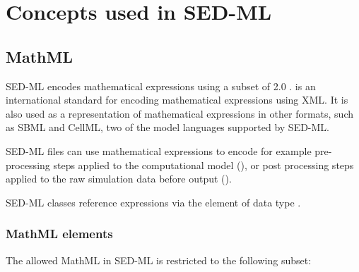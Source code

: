 \pagebreak
\chapter{Concepts used in SED-ML}
\label{chp:concepts}
\section{MathML}
\label{sec:mathML}
SED-ML encodes mathematical expressions using a subset of  2.0 \citep{CIM+01}.  is an international standard for encoding mathematical expressions using XML. It is also used as a representation of mathematical expressions in other formats, such as SBML and CellML, two of the model languages supported by SED-ML. 

SED-ML files can use mathematical expressions to encode for example pre-processing steps applied to the computational model (\ComputeChange), or post processing steps applied to the raw simulation data before output (\DataGenerator). 

SED-ML classes reference  expressions via the element \Math of data type \hyperref[type:mathml]{}.

\subsection{MathML elements}
The allowed MathML in SED-ML is restricted to the following subset: 

